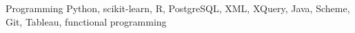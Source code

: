 


\begin{cvskills}


\cvskill
{Programming} %
{Python, scikit-learn, R, PostgreSQL, XML, XQuery, Java, Scheme, Git, Tableau, functional programming} %





\end{cvskills}